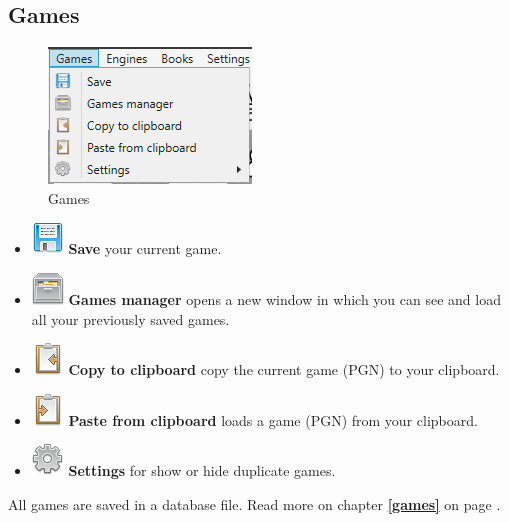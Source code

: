 \documentclass[11pt,a4paper]{article}
\begin{document}
\subsection{Games}
\begin{figure}[H]
	\centering
	\includegraphics[scale=1.0]{Games1.png}
	\caption{Games}
	\label{fig:Games}
\end{figure}
\begin{itemize}
	\item \includegraphics[scale=0.5]{diskette.png} \textbf{Save} your current game.
	\item \includegraphics[scale=0.5]{file_manager.png}  \textbf{Games manager} opens a new window in which you can see and load all your previously saved games.
	\item \includegraphics[scale=0.5]{clipboard_sign_out.png}  \textbf{Copy to clipboard} copy the current game (PGN) to your clipboard.	
	\item \includegraphics[scale=0.5]{clipboard_sign.png}  \textbf{Paste from clipboard} loads a game (PGN) from your clipboard.
	\item \includegraphics[scale=0.5]{cog.png}  \textbf{Settings} for show or hide duplicate games.
	
\end{itemize}
All games are saved in a database file. Read more on chapter \textbf{\ref{games}  } on page \pageref{games}.
\end{document}
